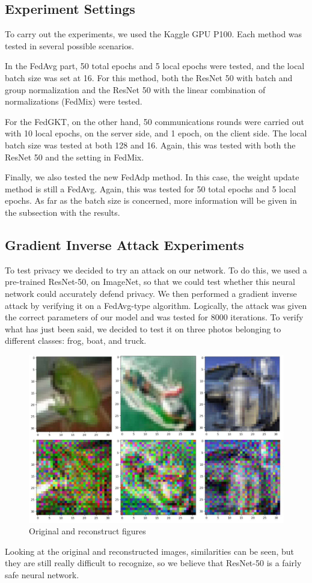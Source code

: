\documentclass[conference]{IEEEtran}
\begin{document}
\subsection{Experiment Settings}
To carry out the experiments, we used the Kaggle GPU P100. Each method was tested in several possible scenarios.

In the FedAvg part, 50 total epochs and 5 local epochs were tested, and the local batch size was set at 16. For this method, both the ResNet 50 with batch and group normalization and the ResNet 50 with the linear combination of normalizations (FedMix) were tested.

For the FedGKT, on the other hand, 50 communications rounds were carried out with 10 local epochs, on the server side, and 1 epoch, on the client side. The local batch size was tested at both 128 and 16. Again, this was tested with both the ResNet 50 and the setting in FedMix.

Finally, we also tested the new FedAdp method. In this case, the weight update method is still a FedAvg. Again, this was tested for 50 total epochs and 5 local epochs. As far as the batch size is concerned, more information will be given in the subsection with the results.

\subsection{Gradient Inverse Attack Experiments}
To test privacy we decided to try an attack on our network. To do this, we used a pre-trained ResNet-50, on ImageNet, so that we could test whether this neural network could accurately defend privacy. We then performed a gradient inverse attack by verifying it on a FedAvg-type algorithm.
Logically, the attack was given the correct parameters of our model and was tested for 8000 iterations. To verify what has just been said, we decided to test it on three photos belonging to different classes: frog, boat, and truck. 
\begin{figure}[H]
    \centering
    \includegraphics[width=\columnwidth]{Images/Comparison inverse attack.jpg}
    \caption{Original and reconstruct figures}
    \label{fig:1}
\end{figure}
Looking at the original and reconstructed images, similarities can be seen, but they are still really difficult to recognize, so we believe that ResNet-50 is a fairly safe neural network.
\end{document}
